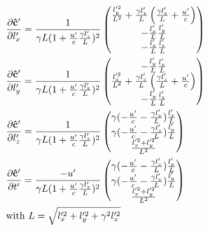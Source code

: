 \begin{equation}
		\begin{aligned}
			&\frac{\partial \mathbf{\hat{c}}'}{\partial l_x'}  =
			\frac{1}{\gamma  L ( 1 + \frac{u'}{c} \frac{\gamma l_z'}{L} )^2}
			\begin{pmatrix}
				\frac{l_y'^2}{ L^2} + \frac{\gamma l_z'}{ L} \left(\frac{\gamma l_z'}{L}+\frac{u'}{c}\right) \\
				- \frac{l_x'}{L} \frac{l_y'}{L}                             \\
				- \frac{l_x'}{L} \frac{l_z'}{L}
			\end{pmatrix}                                                               \\
			&\frac{\partial \mathbf{\hat{c}}'}{\partial l_y'}  =
			\frac{1}{\gamma  L (1+ \frac{u'}{c} \frac{\gamma l_z'}{L} )^2}
			\begin{pmatrix}
				- \frac{l_y'}{L} \frac{l_x'}{L}                             \\
				\frac{l_x'^2}{ L^2} + \frac{\gamma l_z'}{ L} \left(\frac{\gamma l_z'}{L}+\frac{u'}{c}\right) \\
				- \frac{l_y'}{L} \frac{l_z'}{L}
			\end{pmatrix}                                                               \\
			&\frac{\partial \mathbf{\hat{c}}'}{\partial l_z'}  = \frac{1}{\gamma  L
				( 1 + \frac{u'}{c} \frac{\gamma l_z'}{L} )^2}
			\begin{pmatrix}
				\gamma ( - \frac{u'}{c}  - \frac{ \gamma l_z' }{L} ) \frac{l_x'}{L} \\
				\gamma ( - \frac{u'}{c}  - \frac{\gamma l_z' }{L} ) \frac{l_y'}{L}  \\
				\frac{ l_x'^2 + l_y'^2 }{ L^2}
			\end{pmatrix}                                            \\
			&\frac{\partial \mathbf{\hat{c}}'}{\partial t'}  = \frac{-u'}{\gamma  L ( 1 + \frac{u'}{c} \frac{\gamma l_z'}{L} )^2}
			\begin{pmatrix}
				\gamma ( - \frac{u'}{c}  - \frac{ \gamma l_z' }{L} ) \frac{l_x'}{L} \\
				\gamma ( - \frac{u'}{c}  - \frac{\gamma l_z' }{L} ) \frac{l_y'}{L}  \\
				\frac{ l_x'^2 + l_y'^2 }{ L^2}
			\end{pmatrix} \\
			&\text{with $ L=\sqrt{l_x'^2 + l_y'^2 + \gamma^2 l_z'^2}$ }
		\end{aligned}
\end{equation}


